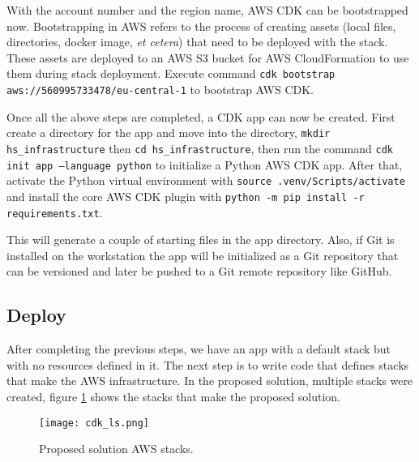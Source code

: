 With the account number and the region name, AWS CDK can be bootstrapped now. Bootstrapping in AWS refers to the process of creating assets (local files, directories, docker image, \textit{et cetera}) that need to be deployed with the stack. These assets are deployed to an AWS S3 bucket for AWS CloudFormation to use them during stack deployment. Execute command \texttt{cdk bootstrap aws://560995733478/eu-central-1} to bootstrap AWS CDK.

Once all the above steps are completed, a CDK app can now be created. First create a directory for the app and move into the directory, \texttt{mkdir hs_infrastructure} then \texttt{cd hs_infrastructure}, then run the command \texttt{cdk init app --language python} to initialize a Python AWS CDK app. After that, activate the Python virtual environment with \texttt{source .venv/Scripts/activate} and install the core AWS CDK plugin with \texttt{python -m pip install -r requirements.txt}.

This will generate a couple of starting files in the app directory. Also, if Git is installed on the workstation the app will be initialized as a Git repository that can be versioned and later be pushed to a Git remote repository like GitHub.




\subsection*{Deploy}
\label{subsec:deploy}

After completing the previous steps, we have an app with a default stack but with no resources defined in it. The next step is to write code that defines stacks that make the AWS infrastructure. In the proposed solution, multiple stacks were created, figure \ref{fig:aws-stacks} shows the stacks that make the proposed solution.

\begin{figure}[H]
    \centering \texttt{[image: cdk\_ls.png]}
    \caption{Proposed solution AWS stacks.}
    \label{fig:aws-stacks}
\end{figure}

